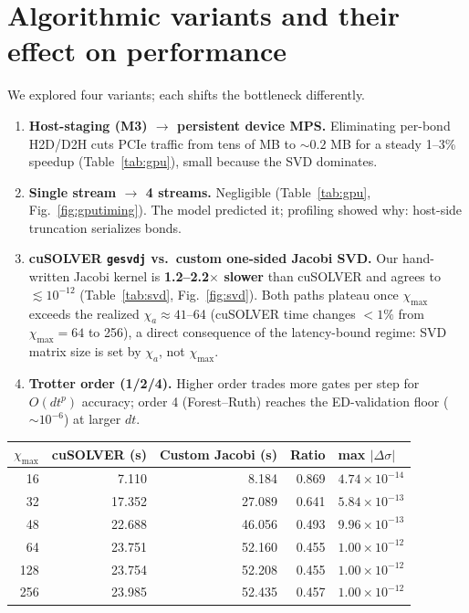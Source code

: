 \documentclass[11pt]{article}
\newcommand{\code}[1]{\texttt{#1}}
\begin{document}
\section{Algorithmic variants and their effect on performance}

We explored four variants; each shifts the bottleneck differently.

\begin{enumerate}
\item \textbf{Host-staging (M3) $\to$ persistent device MPS.} Eliminating per-bond H2D/D2H cuts PCIe traffic from tens of MB to $\sim0.2$ MB for a steady 1--3\% speedup (Table~\ref{tab:gpu}), small because the SVD dominates.

\item \textbf{Single stream $\to$ 4 streams.} Negligible (Table~\ref{tab:gpu}, Fig.~\ref{fig:gputiming}). The model predicted it; profiling showed why: host-side truncation serializes bonds.

\item \textbf{cuSOLVER \code{gesvdj} vs.\ custom one-sided Jacobi SVD.} Our hand-written Jacobi kernel is \textbf{1.2--2.2$\times$ slower} than cuSOLVER and agrees to $\lesssim10^{-12}$ (Table~\ref{tab:svd}, Fig.~\ref{fig:svd}). Both paths plateau once $\chi_{\max}$ exceeds the realized $\chi_a\approx41$--64 (cuSOLVER time changes $<1\%$ from $\chi_{\max}=64$ to 256), a direct consequence of the latency-bound regime: SVD matrix size is set by $\chi_a$, not $\chi_{\max}$.

\item \textbf{Trotter order (1/2/4).} Higher order trades more gates per step for $O(dt^p)$ accuracy; order 4 (Forest--Ruth) reaches the ED-validation floor ($\sim10^{-6}$) at larger $dt$.
\end{enumerate}

\smallskip
\begin{center}\begin{tabular}{rrrrl}
\toprule
$\chi_{\max}$ & cuSOLVER (s) & Custom Jacobi (s) & Ratio & max $|\Delta\sigma|$ \\
\midrule
 16 &  7.110 &  8.184 & 0.869 & $4.74\times10^{-14}$ \\
 32 & 17.352 & 27.089 & 0.641 & $5.84\times10^{-13}$ \\
 48 & 22.688 & 46.056 & 0.493 & $9.96\times10^{-13}$ \\
 64 & 23.751 & 52.160 & 0.455 & $1.00\times10^{-12}$ \\
128 & 23.754 & 52.208 & 0.455 & $1.00\times10^{-12}$ \\
256 & 23.985 & 52.435 & 0.457 & $1.00\times10^{-12}$ \\
\bottomrule
\end{tabular}
\end{center}
\end{document}
